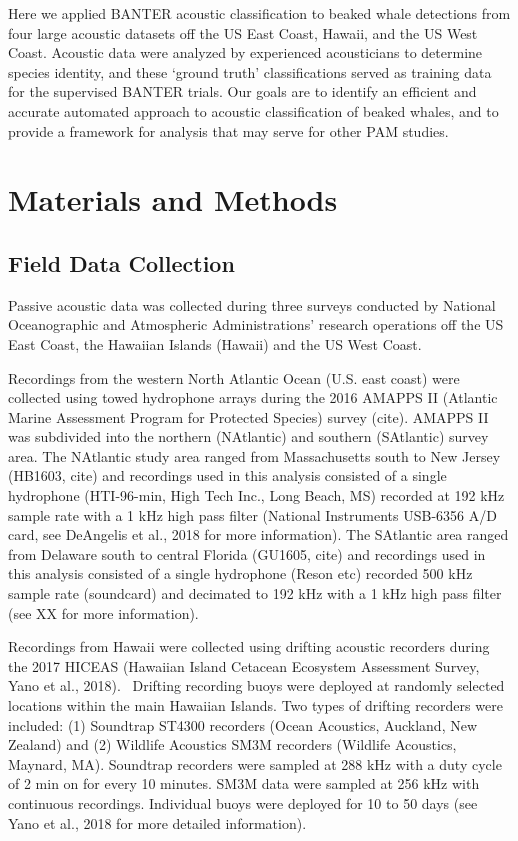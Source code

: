 \documentclass[
  letterpaper,
  DIV=11,
  numbers=noendperiod]{scrartcl}
\begin{document}
Here we applied BANTER acoustic classification to beaked whale
detections from four large acoustic datasets off the US East Coast,
Hawaii, and the US West Coast. Acoustic data were analyzed by
experienced acousticians to determine species identity, and these
`ground truth' classifications served as training data for the
supervised BANTER trials. Our goals are to identify an efficient and
accurate automated approach to acoustic classification of beaked whales,
and to provide a framework for analysis that may serve for other PAM
studies.

\hypertarget{materials-and-methods}{%
\section{Materials and Methods}\label{materials-and-methods}}

\hypertarget{field-data-collection}{%
\subsection{Field Data Collection}\label{field-data-collection}}

Passive acoustic data was collected during three surveys conducted by
National Oceanographic and Atmospheric Administrations' research
operations off the US East Coast, the Hawaiian Islands (Hawaii) and the
US West Coast.

Recordings from the western North Atlantic Ocean (U.S. east coast) were
collected using towed hydrophone arrays during the 2016 AMAPPS II
(Atlantic Marine Assessment Program for Protected Species) survey
(cite). AMAPPS II was subdivided into the northern (NAtlantic) and
southern (SAtlantic) survey area. The NAtlantic study area ranged from
Massachusetts south to New Jersey (HB1603, cite) and recordings used in
this analysis consisted of a single hydrophone (HTI-96-min, High Tech
Inc., Long Beach, MS) recorded at 192 kHz sample rate with a 1 kHz high
pass filter (National Instruments USB-6356 A/D card, see DeAngelis et
al., 2018 for more information). The SAtlantic area ranged from Delaware
south to central Florida (GU1605, cite) and recordings used in this
analysis consisted of a single hydrophone (Reson etc) recorded 500 kHz
sample rate (soundcard) and decimated to 192 kHz with a 1 kHz high pass
filter (see XX for more information).

Recordings from Hawaii were collected using drifting acoustic recorders
during the 2017 HICEAS (Hawaiian Island Cetacean Ecosystem Assessment
Survey, Yano et al., 2018).~ Drifting recording buoys were deployed at
randomly selected locations within the main Hawaiian Islands. Two types
of drifting recorders were included: (1) Soundtrap ST4300 recorders
(Ocean Acoustics, Auckland, New Zealand) and (2) Wildlife Acoustics SM3M
recorders (Wildlife Acoustics, Maynard, MA). Soundtrap recorders were
sampled at 288 kHz with a duty cycle of 2 min on for every 10 minutes.
SM3M data were sampled at 256 kHz with continuous recordings. Individual
buoys were deployed for 10 to 50 days (see Yano et al., 2018 for more
detailed information).
\end{document}
